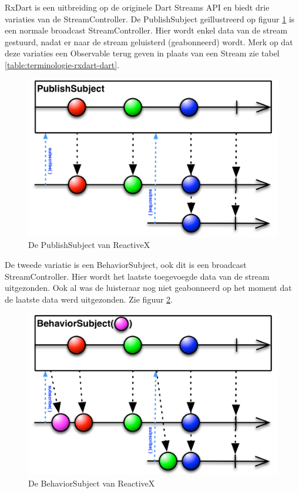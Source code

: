 RxDart is een uitbreiding op de originele Dart Streams API en biedt drie variaties van de StreamController.
\newline 
De PublishSubject geïllustreerd op figuur \ref{fig:rxdart-publishsubject} is een normale broadcast StreamController. Hier wordt enkel data van de stream gestuurd, nadat er naar de stream geluisterd (geabonneerd) wordt.
Merk op dat deze variaties een Observable terug geven in plaats van een Stream zie tabel \ref{table:terminologie-rxdart-dart}.


\begin{figure}[H]
    \centering
    \includegraphics[width=\figureWidthModifier\linewidth]{img/stand-van-zaken/rxdart-publishsubject.png}
    \caption{De PublishSubject van ReactiveX \autocite{Boelens2018}}
    \label{fig:rxdart-publishsubject}
\end{figure}

De tweede variatie is een BehaviorSubject, ook dit is een broadcast StreamController. Hier wordt het laatste toegevoegde data van de stream uitgezonden. Ook al was de luisteraar nog niet geabonneerd op het moment dat de laatste data werd uitgezonden. Zie figuur \ref{fig:rxdart-behaviorsubject}. 

\begin{figure}[H]
    \centering
    \includegraphics[width=\figureWidthModifier\linewidth]{img/stand-van-zaken/rxdart-behaviorsubject.png}
    \caption{De BehaviorSubject van ReactiveX \autocite{Boelens2018}}
    \label{fig:rxdart-behaviorsubject}
\end{figure}

